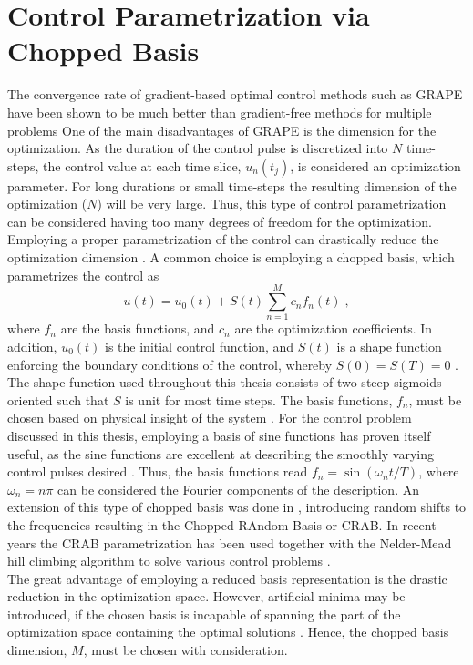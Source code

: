 \section{Control Parametrization via Chopped Basis} \label{sec:GROUP}
The convergence rate of gradient-based optimal control methods such as GRAPE have been shown to be much better than gradient-free methods for multiple problems \cite{Jager2014, sorensen2018}
One of the main disadvantages of GRAPE is the dimension for the optimization. As the duration of the control pulse is discretized into $N$ time-steps, the control value at each time slice, $u_n (t_j)$, is considered an optimization parameter. For long durations or small time-steps the resulting dimension of the optimization ($N$) will be very large. Thus, this type of control parametrization can be considered having too many degrees of freedom for the optimization.\\
Employing a proper parametrization of the control can drastically reduce the optimization dimension \cite{Winckel2008}.
A common choice is employing a chopped basis, which parametrizes the control as
\begin{equation}
	u(t) = u_0 (t) + S(t) \sum_{n=1}^{M} c_n f_n (t) \; , \label{eq:controlParametrization}
\end{equation}   
where $f_n$ are the basis functions, and $c_n$ are the optimization coefficients. In addition, $u_0 (t)$ is the initial control function, and $S (t)$ is a shape function enforcing the boundary conditions of the control, whereby $S(0) = S(T) = 0$ \cite{sorensen2018}. The shape function used throughout this thesis consists of two steep sigmoids oriented such that $S$ is unit for most time steps. The basis functions, $f_n$, must be chosen based on physical insight of the system \cite{Ruths2012}. For the control problem discussed in this thesis, employing a basis of sine functions has proven itself useful, as the sine functions are excellent at describing the smoothly varying control pulses desired \cite{sorensen2018,Jiang2009}. Thus, the basis functions read $f_n = \sin \left( \omega_n t / T \right)$, where $\omega_n = n \pi$ can be considered the Fourier components of the description.
An extension of this type of chopped basis was done in \cite{Doria2011,Caneva2011crab}, introducing random shifts to the frequencies resulting in the Chopped RAndom Basis or \textsc{CRAB}. In recent years the \textsc{CRAB} parametrization has been used together with the Nelder-Mead hill climbing algorithm to solve various control problems \cite{Doria2011,Caneva2011,FrankBloch,Lloyd2014}.\\
The great advantage of employing a reduced basis representation is the drastic reduction in the optimization space. However, artificial minima may be introduced, if the chosen basis is incapable of spanning the part of the optimization space containing the optimal solutions \cite{Rach2015}. Hence, the chopped basis dimension, $M$, must be chosen with consideration.


